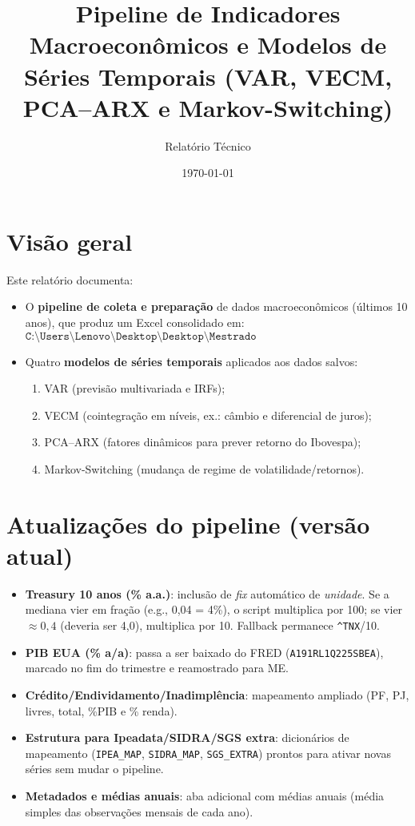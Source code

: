 \documentclass[11pt,a4paper]{article}
\title{Pipeline de Indicadores Macroeconômicos e Modelos de Séries Temporais (VAR, VECM, PCA--ARX e Markov-Switching)}
\author{Relatório Técnico}
\date{\today}
\begin{document}
\maketitle
\tableofcontents
\newpage

\section{Visão geral}
Este relatório documenta:
\begin{itemize}
    \item O \textbf{pipeline de coleta e preparação} de dados macroeconômicos (últimos 10 anos), que produz um Excel consolidado em:
    \[
      \texttt{C:\textbackslash Users\textbackslash Lenovo\textbackslash Desktop\textbackslash Desktop\textbackslash Mestrado FGV\textbackslash IndicadoresMacro\textbackslash indicadores\_macro.xlsx}
    \]
    \item Quatro \textbf{modelos de séries temporais} aplicados aos dados salvos:
    \begin{enumerate}
        \item VAR (previsão multivariada e IRFs);
        \item VECM (cointegração em níveis, ex.: câmbio e diferencial de juros);
        \item PCA--ARX (fatores dinâmicos para prever retorno do Ibovespa);
        \item Markov-Switching (mudança de regime de volatilidade/retornos).
    \end{enumerate}
\end{itemize}

\section{Atualizações do pipeline (versão atual)}
\begin{itemize}
  \item \textbf{Treasury 10 anos (\% a.a.)}: inclusão de \emph{fix} automático de \emph{unidade}. Se a mediana vier em fração (e.g., 0{,}04 = 4\%), o script multiplica por 100; se vier \(\approx 0{,}4\) (deveria ser 4{,}0), multiplica por 10. Fallback permanece \texttt{\^{}TNX}/10.
  \item \textbf{PIB EUA (\% a/a)}: passa a ser baixado do FRED (\texttt{A191RL1Q225SBEA}), marcado no fim do trimestre e reamostrado para ME.
  \item \textbf{Crédito/Endividamento/Inadimplência}: mapeamento ampliado (PF, PJ, livres, total, \%PIB e \% renda).
  \item \textbf{Estrutura para Ipeadata/SIDRA/SGS extra}: dicionários de mapeamento (\texttt{IPEA\_MAP}, \texttt{SIDRA\_MAP}, \texttt{SGS\_EXTRA}) prontos para ativar novas séries sem mudar o pipeline.
  \item \textbf{Metadados e médias anuais}: aba adicional com médias anuais (média simples das observações mensais de cada ano).
\end{itemize}
\end{document}
